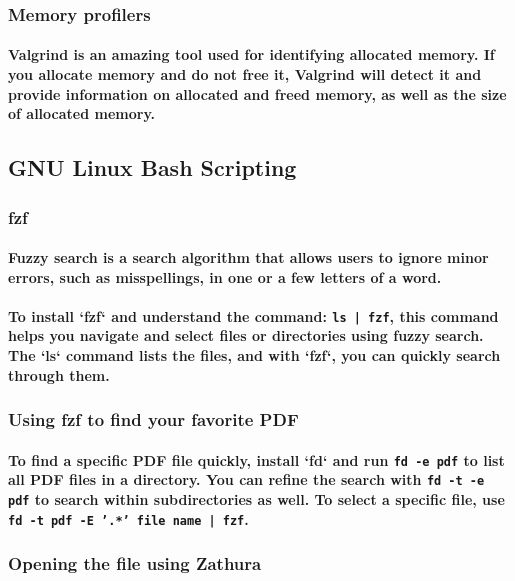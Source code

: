\documentclass[11pt]{article}
\begin{document}
\subsubsection{Memory profilers}
\paragraph{\small Valgrind is an amazing tool used for identifying allocated memory. If you allocate memory and do not free it, Valgrind will detect it and provide information on allocated and freed memory, as well as the size of allocated memory.}

\subsection{GNU Linux Bash Scripting}
\subsubsection{fzf}
\paragraph{\small Fuzzy search is a search algorithm that allows users to ignore minor errors, such as misspellings, in one or a few letters of a word.}
\paragraph{\small To install `fzf` and understand the command: \texttt{ls | fzf}, this command helps you navigate and select files or directories using fuzzy search. The `ls` command lists the files, and with `fzf`, you can quickly search through them.}

\subsubsection{Using fzf to find your favorite PDF}
\paragraph{\small To find a specific PDF file quickly, install `fd` and run \texttt{fd -e pdf} to list all PDF files in a directory. You can refine the search with \texttt{fd -t -e pdf} to search within subdirectories as well. To select a specific file, use \texttt{fd -t pdf -E '.*' file name | fzf}.}

\subsubsection{Opening the file using Zathura}
\end{document}
